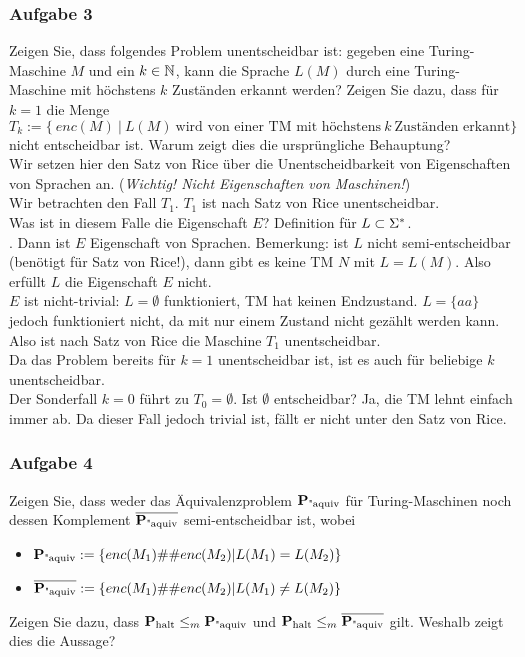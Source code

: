 \subsubsection*{Aufgabe 3}
    Zeigen Sie, dass folgendes Problem unentscheidbar ist: gegeben eine Turing-Maschine $M$ und ein $k \in \mathbb{N}$, kann die Sprache $L(M)$ durch eine Turing-Maschine mit höchstens $k$ Zuständen erkannt werden?
    Zeigen Sie dazu, dass für $k = 1$ die Menge $T_{k} := \{\ enc(M)\ |\ L(M)\ \text{wird von einer TM mit höchstens}\ k\ \text{Zuständen erkannt} \}$ nicht entscheidbar ist. Warum zeigt dies die ursprüngliche Behauptung? \\

    \LOES Wir setzen hier den Satz von Rice über die Unentscheidbarkeit von Eigenschaften von Sprachen an. (\textit{Wichtig! Nicht Eigenschaften von Maschinen!}) \\
    Wir betrachten den Fall $T_{1}$. $T_{1}$ ist nach Satz von Rice unentscheidbar. \\
    Was ist in diesem Falle die Eigenschaft $E$? Definition für $L \subset \Sigma^{*}$. \\
    . Dann ist $E$ Eigenschaft von Sprachen. Bemerkung: ist $L$ nicht semi-entscheidbar (benötigt für Satz von Rice!), dann gibt es keine TM $N$  mit $L = L(M)$. Also erfüllt $L$ die Eigenschaft $E$ nicht. \\
    $E$ ist nicht-trivial: $L = \emptyset$ funktioniert, TM hat keinen Endzustand. $L = \{ aa \}$ jedoch funktioniert nicht, da mit nur einem Zustand nicht gezählt werden kann.
    Also ist nach Satz von Rice die Maschine $T_{1}$ unentscheidbar. \\
    Da das Problem bereits für $k=1$ unentscheidbar ist, ist es auch für beliebige $k$ unentscheidbar. \\
    Der Sonderfall $k=0$ führt zu $T_{0} = \emptyset$. Ist $\emptyset$ entscheidbar? Ja, die TM lehnt einfach immer ab. Da dieser Fall jedoch trivial ist, fällt er nicht unter den Satz von Rice.

\newpage
\subsubsection*{Aufgabe 4}
    Zeigen Sie, dass weder das Äquivalenzproblem $\textbf{P}_{\text{"aquiv}}$ für Turing-Maschinen noch dessen Komplement $\overline{\textbf{P}_{\text{"aquiv}}}$ semi-entscheidbar ist, wobei
    \begin{itemize}
        \item $\textbf{P}_{\text{"aquiv}} := \{ enc(M_{1}) \#\# enc(M_{2}) | L(M_{1}) = L(M_{2}) \}$
        \item $\overline{\textbf{P}_{\text{"aquiv}}} := \{ enc(M_{1}) \#\# enc(M_{2}) | L(M_{1}) \neq L(M_{2}) \}$
    \end{itemize}
    Zeigen Sie dazu, dass $\textbf{P}_{\text{halt}} \leq_{m} \textbf{P}_{\text{"aquiv}}$ und $\textbf{P}_{\text{halt}} \leq_{m} \overline{\textbf{P}_{\text{"aquiv}}}$ gilt. Weshalb zeigt dies die Aussage? \\

